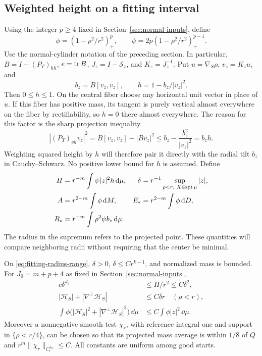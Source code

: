 \subsection{Weighted height on a fitting interval}

Using the integer $p\ge4$ fixed in Section~\ref{sec:normal-inputs}, define
\[
 \phi=(1-\rho^2/r^2)_+^p,
 \qquad \psi=2p(1-\rho^2/r^2)_+^{p-1}.
\]
Use the normal-cylinder notation of the preceding section. In particular,
$B=I-(P_T)_{hh}$, $e=\operatorname{tr} B$, $J_z=I-\mathcal S_z$, and $K_z=J_z^{-1}$.
Put $u=\nabla_S\rho$, $v_z=K_zu$, and
\[
 b_z=B[v_z,v_z],\qquad h=1-b_z/|v_z|^2.
\]
Then $0\le h\le1$. On the central fiber choose any horizontal unit
vector in place of $u$. If this fiber has positive mass, its tangent is
purely vertical almost everywhere on the fiber by rectifiability, so
$h=0$ there almost everywhere. The reason for this factor is the sharp
projection inequality
\[
 |(P_T)_{vh}v_z|^2
   =B[v_z,v_z]-|Bv_z|^2
   \le b_z-\frac{b_z^2}{|v_z|^2}=b_zh.
\]
Weighting squared height by $h$ will therefore pair it directly with
the radial tilt $b_z$ in Cauchy--Schwarz. No positive lower bound for
$h$ is assumed. Define
\begin{equation}\label{eq:interval-quantities}
 \begin{aligned}
 H&=r^{-m}\int\psi|z|^2h\,\mathrm d\mu,
 &\delta&=r^{-1}\sup_{\rho<r,\ X\in\operatorname{spt}\mu}|z|,\\
 A&=r^{2-m}\int\phi\,\mathrm d M,
 &E_*&=r^{2-m}\int\phi\,\mathrm d D,\\
 R_*&=r^{-m}\int\rho^2\psi b_z\,\mathrm d\mu.
 \end{aligned}
\end{equation}
The radius in the supremum refers to the projected point. These
quantities will compare neighboring radii without requiring that the
center be minimal.

\begin{lemma}\label{lem:weighted-bounds}
On \eqref{eq:fitting-radius-range}, $\delta>0$, $\delta\le Cr^{k-1}$,
and normalized mass is bounded. For $J_0=m+p+4$ as fixed in
Section~\ref{sec:normal-inputs},
\begin{align}
 c\delta^{J_0}&\le H/r^2\le C\delta^2,
                                  \label{eq:height-power-bounds}\\
 |\mathcal H_S|+|\nabla^\perp\mathcal H_S|
   &\le C\delta r\quad(\rho<r),\label{eq:point-curvature-bound}\\
 \int\phi\bigl(|\mathcal H_S|^2+
                    |\nabla^\perp\mathcal H_S|^2\bigr)\,\dd\mu
   &\le C\int\phi|z|^2\,\dd\mu.\label{eq:weighted-curvature-bound}
\end{align}
Moreover a nonnegative smooth test $\chi_r$, with reference integral
one and support in $\{\rho<r/4\}$, can be chosen so that its
projected mass average is within $1/8$ of $Q$ and
$r^m\|\chi_r\|_{C^{J_{\mathrm{sc}}}_r}\le C$.
All constants are uniform among good starts.
\end{lemma}

